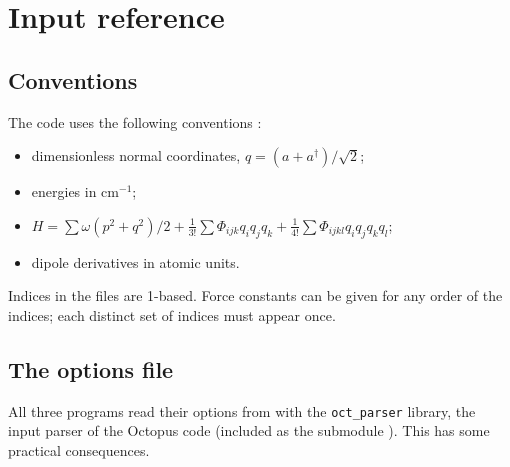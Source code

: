 \chapter{Input reference}\label{ch:inputs}

\section{Conventions}

The code uses the following conventions :
\begin{itemize}
\item dimensionless normal coordinates, $q=(a+a^\dagger)/\sqrt2$;
\item energies in cm$^{-1}$;
\item $H=\sum\omega(p^2+q^2)/2+\frac{1}{3!}\sum\Phi_{ijk}q_iq_jq_k
  +\frac{1}{4!}\sum\Phi_{ijkl}q_iq_jq_kq_l$;
\item dipole derivatives in atomic units.
\end{itemize}
Indices in the files are 1-based. Force constants can be given for any
order of the indices; each distinct set of indices must appear once.

\section{The options file }\label{sec:inp}

All three programs read their options from  with the
\texttt{oct\_parser} library, the input parser of the Octopus code
(included as the submodule ). This has some
practical consequences.

